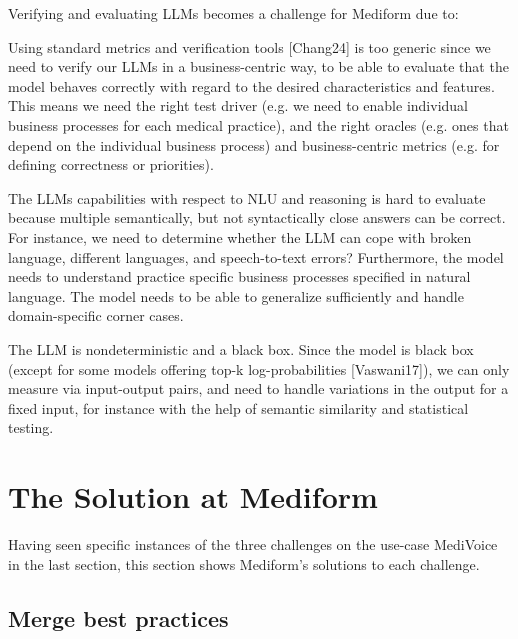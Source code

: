 \documentclass[twocolumn]{article}
\begin{document}
Verifying and evaluating LLMs becomes a challenge for Mediform due to:
\begin{compactitem}
\item Using standard metrics and verification tools [Chang24] is too generic since we need to verify our LLMs in a business-centric way, to be able to evaluate that the model behaves correctly with regard to the desired characteristics and features. This means we need the right test driver (e.g. we need to enable individual business processes for each medical practice), and the right oracles (e.g. ones that depend on the individual business process) and business-centric metrics (e.g. for defining correctness or priorities).
\item The LLMs capabilities with respect to NLU and reasoning is hard to evaluate because multiple semantically, but not syntactically close answers can be correct. For instance, we need to determine whether the LLM can cope with broken language, different languages, and speech-to-text errors? Furthermore, the model needs to understand practice specific business processes specified in natural language. The model needs to be able to generalize sufficiently and handle domain-specific corner cases.
\item The LLM is nondeterministic and a black box. Since the model is black box (except for some models offering top-k log-probabilities [Vaswani17]), we can only measure via input-output pairs, and need to handle variations in the output for a fixed input, for instance with the help of semantic similarity and statistical testing.
\end{compactitem}

\section{The Solution at Mediform}

Having seen specific instances of the three challenges on the use-case MediVoice in the last section, this section shows Mediform’s solutions to each challenge.

\subsection{Merge best practices}
\end{document}

